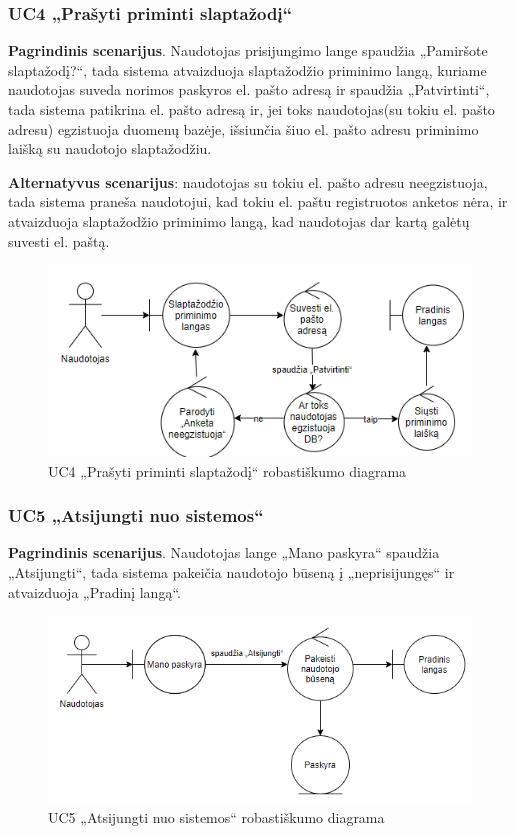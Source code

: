 \documentclass{VUMIFPSbakalaurinis}
\begin{document}
\subsubsection{UC4 „Prašyti priminti slaptažodį“}
\textbf{Pagrindinis scenarijus}. Naudotojas prisijungimo lange spaudžia „Pamiršote slaptažodį?“, tada sistema atvaizduoja slaptažodžio priminimo langą, kuriame naudotojas suveda norimos paskyros el. pašto adresą ir spaudžia „Patvirtinti“, tada sistema patikrina el. pašto adresą ir, jei toks naudotojas(su tokiu el. pašto adresu) egzistuoja duomenų bazėje, išsiunčia šiuo el. pašto adresu priminimo laišką su naudotojo slaptažodžiu. 
\par \textbf{Alternatyvus scenarijus}: naudotojas su tokiu el. pašto adresu neegzistuoja, tada sistema praneša naudotojui, kad tokiu el. paštu registruotos anketos nėra, ir atvaizduoja slaptažodžio priminimo langą, kad naudotojas dar kartą galėtų suvesti el. paštą.

\begin{figure}[H]
	\centering
	\includegraphics[scale=0.6]{img/Robustness/UC4}
	\caption{UC4 „Prašyti priminti slaptažodį“ robastiškumo diagrama}
	\label{img:uc4rob}
\end{figure}

\subsubsection{UC5 „Atsijungti nuo sistemos“}
\textbf{Pagrindinis scenarijus}. Naudotojas lange „Mano paskyra“ spaudžia „Atsijungti“, tada sistema pakeičia naudotojo būseną į „neprisijungęs“ ir atvaizduoja „Pradinį langą“.

\begin{figure}[H]
	\centering
	\includegraphics[scale=0.6]{img/Robustness/UC5}
	\caption{UC5 „Atsijungti nuo sistemos“ robastiškumo diagrama}
	\label{img:uc5rob}
\end{figure}
\end{document}

